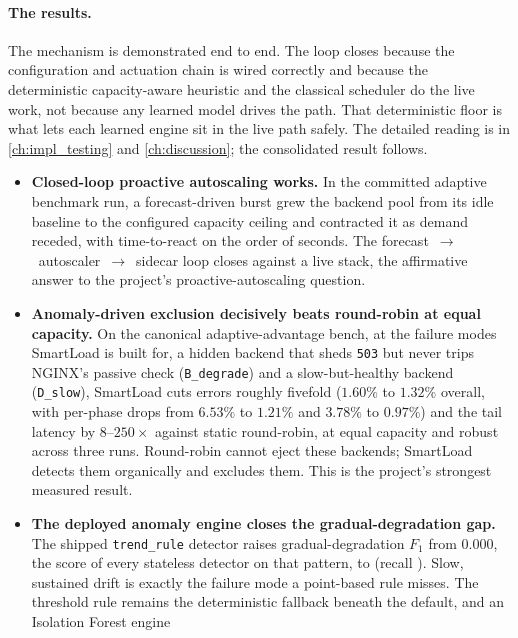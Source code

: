 \paragraph{The results.} The mechanism is demonstrated end to end. The loop closes
because the configuration and actuation chain is wired correctly and because the
deterministic capacity-aware heuristic and the classical scheduler do the live work, not
because any learned model drives the path. That deterministic floor is what lets each
learned engine sit in the live path safely. The detailed reading is in
\cref{ch:impl_testing} and \cref{ch:discussion}; the consolidated result follows.

\begin{itemize}
  \item \textbf{Closed-loop proactive autoscaling works.} In the committed adaptive
        benchmark run, a forecast-driven burst grew the backend pool from its idle
        baseline to the configured capacity ceiling and contracted it as demand receded,
        with time-to-react on the order of seconds. The
        forecast~$\rightarrow$~autoscaler~$\rightarrow$~sidecar loop closes against a live
        stack, the affirmative answer to the project's proactive-autoscaling question.
  \item \textbf{Anomaly-driven exclusion decisively beats round-robin at equal capacity.}
        On the canonical adaptive-advantage bench, at the failure modes SmartLoad is built
        for, a hidden backend that sheds \texttt{503} but never trips NGINX's passive check
        (\texttt{B\_degrade}) and a slow-but-healthy backend (\texttt{D\_slow}), SmartLoad
        cuts errors roughly fivefold ($1.60\%$ to $1.32\%$ overall, with per-phase drops
        from $6.53\%$ to $1.21\%$ and $3.78\%$ to $0.97\%$) and the tail latency by
        $8$--$250\times$ against static round-robin, at equal capacity and robust across
        three runs. Round-robin cannot eject these backends; SmartLoad detects them
        organically and excludes them. This is the project's strongest measured result.
  \item \textbf{The deployed anomaly engine closes the gradual-degradation gap.} The
        shipped \texttt{trend\_rule} detector raises gradual-degradation $F_1$ from
        $0.000$, the score of every stateless detector on that pattern, to \BManFone{}
        (recall \BManRecall{}). Slow, sustained drift is exactly the
        failure mode a point-based rule misses. The threshold rule remains the
        deterministic fallback beneath the default, and an Isolation Forest engine

\end{itemize}
